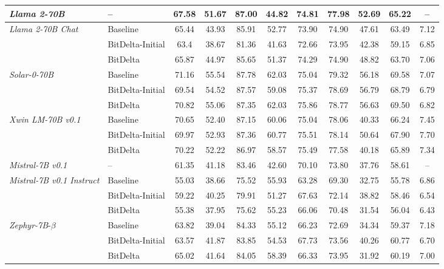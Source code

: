 \documentclass[numbers]{article}
\begin{document}
\begin{table}[htbp]
{\begin{tabular}{@{}llccccccccc@{}}
        \midrule
        \textit{Llama 2-70B} & -- & 67.58 & 51.67 & 87.00 & 44.82 & 74.81 & 77.98 & 52.69 & 65.22 & -- \\
        
        \midrule
        \multirow{3}{*}{\textit{Llama 2-70B Chat}} & Baseline & 65.44 & 43.93 & 85.91 & 52.77 & 73.90 & 74.90 & 47.61 & 63.49 & 7.12 \\
        & BitDelta-Initial & 63.4 & 38.67 & 81.36 & 41.63 & 72.66 & 73.95 & 42.38 & 59.15 & 6.85 \\
        & BitDelta & 65.87 & 44.97   & 85.65 & 51.37  & 74.29 & 74.90 & 48.82 & 63.70 & 7.06 \\

        \midrule
        \multirow{3}{*}{\textit{Solar-0-70B}} & Baseline & 71.16 & 55.54 & 87.78 & 62.03 & 75.04 & 79.32 & 56.18 & 69.58 & 7.07 \\
        & BitDelta-Initial & 69.54 & 54.52 & 87.57 & 59.08 & 75.37 & 78.69 & 56.79 & 68.79 & 6.79 \\
        & BitDelta & 70.82 & 55.06 & 87.35 & 62.03 & 75.86 & 78.77 & 56.63 & 69.50 & 6.82 \\

        \midrule
        \multirow{3}{*}{\textit{Xwin LM-70B v0.1}} & Baseline & 70.65 & 52.40 & 87.15 & 60.06 & 75.04 & 78.06 & 40.33 & 66.24 & 7.45 \\
        & BitDelta-Initial & 69.97 & 52.93 & 87.36 & 60.77 & 75.51 & 78.14 & 50.64 & 67.90 & 7.70 \\
        & BitDelta & 70.22 & 52.22 & 86.97 & 58.57 & 75.49 & 77.58 & 40.18 & 65.89 & 7.34 \\

        \midrule
        \textit{Mistral-7B v0.1} & -- & 61.35 & 41.18 & 83.46 & 42.60 & 70.10 & 73.80 & 37.76 & 58.61 & -- \\
        
        \midrule
        \multirow{3}{*}{\textit{Mistral-7B v0.1 Instruct}} & Baseline & 55.03 & 38.66 & 75.52 & 55.93 & 63.28 & 69.30 & 32.75 & 55.78 & 6.86 \\
        & BitDelta-Initial & 59.22 & 40.25 & 79.91 & 51.27 & 67.63 & 72.14 & 38.82 & 58.46 & 6.54 \\
        & BitDelta & 55.38 & 37.95 & 75.62 & 55.23 & 66.06 & 70.48 & 31.54 & 56.04 & 6.43 \\

        \midrule
        \multirow{3}{*}{\textit{Zephyr-7B}-$\beta$} & Baseline & 63.82 & 39.04 & 84.33 & 55.12 & 66.23 & 72.69 & 34.34 & 59.37 & 7.18 \\
        & BitDelta-Initial & 63.57 & 41.87 & 83.85 & 54.53 & 67.73 & 73.56 & 40.26 & 60.77 & 6.70 \\
        & BitDelta & 65.02 & 41.64 & 84.05 & 58.39 & 66.33 & 73.95 & 31.92 & 60.19 & 7.00 \\


\end{tabular}}
\end{table}
\end{document}

